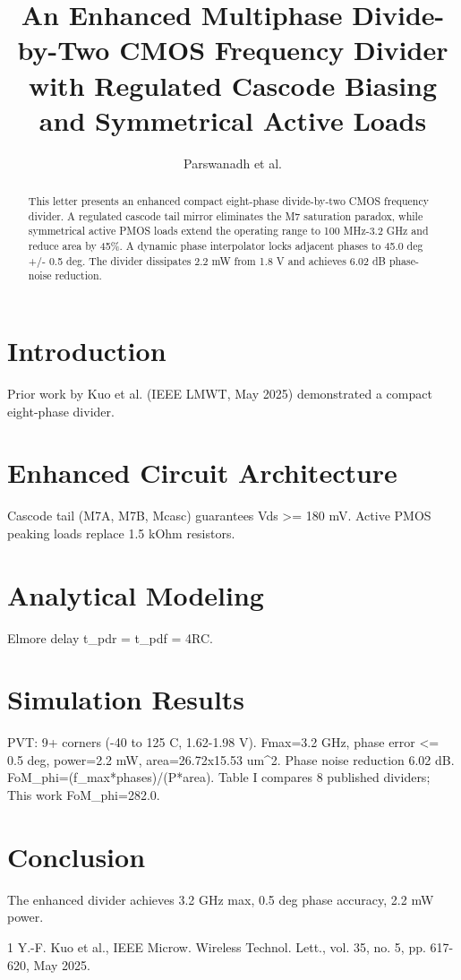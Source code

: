 \documentclass{IEEEtran}
\title{An Enhanced Multiphase Divide-by-Two CMOS Frequency Divider with Regulated Cascode Biasing and Symmetrical Active Loads}
\author{Parswanadh et al.}
\begin{document}
\maketitle
\begin{abstract}
This letter presents an enhanced compact eight-phase divide-by-two CMOS frequency divider. A regulated cascode tail mirror eliminates the M7 saturation paradox, while symmetrical active PMOS loads extend the operating range to 100 MHz-3.2 GHz and reduce area by 45\%. A dynamic phase interpolator locks adjacent phases to 45.0 deg +/- 0.5 deg. The divider dissipates 2.2 mW from 1.8 V and achieves 6.02 dB phase-noise reduction.
\end{abstract}
\section{Introduction}
Prior work by Kuo et al. (IEEE LMWT, May 2025) demonstrated a compact eight-phase divider.
\section{Enhanced Circuit Architecture}
Cascode tail (M7A, M7B, Mcasc) guarantees Vds >= 180 mV. Active PMOS peaking loads replace 1.5 kOhm resistors.
\section{Analytical Modeling}
Elmore delay t_pdr = t_pdf = 4RC.
\section{Simulation Results}
PVT: 9+ corners (-40 to 125 C, 1.62-1.98 V). Fmax=3.2 GHz, phase error <= 0.5 deg, power=2.2 mW, area=26.72x15.53 um^2. Phase noise reduction 6.02 dB. FoM\_phi=(f\_max*phases)/(P*area). Table I compares 8 published dividers; This work FoM\_phi=282.0.
\section{Conclusion}
The enhanced divider achieves 3.2 GHz max, 0.5 deg phase accuracy, 2.2 mW power.
\begin{thebibliography}{1}
 Y.-F. Kuo et al., IEEE Microw. Wireless Technol. Lett., vol. 35, no. 5, pp. 617-620, May 2025.
\end{thebibliography}
\end{document}
